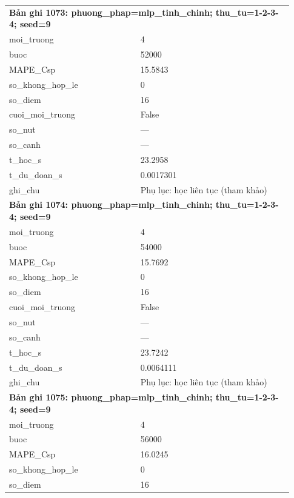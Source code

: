 \begin{longtable}{p{0.43\linewidth}p{0.50\linewidth}}
\midrule
\multicolumn{2}{p{0.95\linewidth}}{\textbf{Bản ghi 1073: phuong\_phap=mlp\_tinh\_chinh; thu\_tu=1-2-3-4; seed=9}} \\
moi\_\allowbreak truong & 4 \\
buoc & 52000 \\
MAPE\_\allowbreak Csp & 15.5843 \\
so\_\allowbreak khong\_\allowbreak hop\_\allowbreak le & 0 \\
so\_\allowbreak diem & 16 \\
cuoi\_\allowbreak moi\_\allowbreak truong & False \\
so\_\allowbreak nut & — \\
so\_\allowbreak canh & — \\
t\_\allowbreak hoc\_\allowbreak s & 23.2958 \\
t\_\allowbreak du\_\allowbreak doan\_\allowbreak s & 0.0017301 \\
ghi\_\allowbreak chu & Phụ lục: học liên tục (tham khảo) \\
\midrule
\multicolumn{2}{p{0.95\linewidth}}{\textbf{Bản ghi 1074: phuong\_phap=mlp\_tinh\_chinh; thu\_tu=1-2-3-4; seed=9}} \\
moi\_\allowbreak truong & 4 \\
buoc & 54000 \\
MAPE\_\allowbreak Csp & 15.7692 \\
so\_\allowbreak khong\_\allowbreak hop\_\allowbreak le & 0 \\
so\_\allowbreak diem & 16 \\
cuoi\_\allowbreak moi\_\allowbreak truong & False \\
so\_\allowbreak nut & — \\
so\_\allowbreak canh & — \\
t\_\allowbreak hoc\_\allowbreak s & 23.7242 \\
t\_\allowbreak du\_\allowbreak doan\_\allowbreak s & 0.0064111 \\
ghi\_\allowbreak chu & Phụ lục: học liên tục (tham khảo) \\
\midrule
\multicolumn{2}{p{0.95\linewidth}}{\textbf{Bản ghi 1075: phuong\_phap=mlp\_tinh\_chinh; thu\_tu=1-2-3-4; seed=9}} \\
moi\_\allowbreak truong & 4 \\
buoc & 56000 \\
MAPE\_\allowbreak Csp & 16.0245 \\
so\_\allowbreak khong\_\allowbreak hop\_\allowbreak le & 0 \\
so\_\allowbreak diem & 16 \\

\end{longtable}

